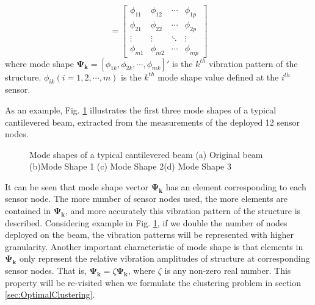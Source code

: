 \begin{equation}
[\mathbf{\Psi_1}, \mathbf{\Psi_2}, \cdots, \mathbf{\Psi_p}]=
\begin{bmatrix}
\phi_{11} & \phi_{12} & \cdots & \phi_{1p}\\
\phi_{21} & \phi_{22} & \cdots & \phi_{2p}\\
\vdots  & \vdots  & \ddots & \vdots  \\
\phi_{m1} & \phi_{m2} & \cdots & \phi_{mp}
\end{bmatrix} 
\end{equation}
where mode shape \(\mathbf{\Psi_k}=[\phi_{1k}, \phi_{2k}, \cdots, \phi_{mk}]'\) is the \(k^{th}\) vibration pattern of the structure.  \(\phi_{ik}(i=1,2,\cdots ,m)\) is the \(k^{th}\) mode shape value defined at the \(i^{th}\) sensor.

As an example, Fig. \ref{fig:modes} illustrates the first three mode shapes of a typical cantilevered beam, extracted from the measurements of the deployed 12 sensor nodes. 

\begin{figure}
\centering
\subfloat[]{\label{fig:originalbeam}
\texttt{[image: originalbeam]}}
\subfloat[]{\label{fig:mode1}
\texttt{[image: mode1]}}
\qquad
\subfloat[]{\label{fig:mode2}
\texttt{[image: mode2]}}
\subfloat[]{\label{fig:mode3}
\texttt{[image: mode3]}}
\caption{Mode shapes of a typical cantilevered beam (a) Original beam (b)Mode Shape 1 (c) Mode Shape 2(d) Mode Shape 3}
\label{fig:modes}
\end{figure}

It can be seen that mode shape vector \(\mathbf{\Psi_k}\) has an element corresponding to each sensor node. The more number of sensor nodes used, the more elements are contained in \(\mathbf{\Psi_k}\), and more accurately this vibration pattern of the structure is described. Considering example in Fig. \ref{fig:modes}, if we double the number of nodes deployed on the beam, the vibration patterns will be represented with higher granularity. Another important characteristic of mode shape is that elements in \(\mathbf{\Psi_k}\) only represent the relative vibration amplitudes of structure at corresponding sensor nodes. That is, \(\mathbf{\Psi_k}=\zeta \mathbf{\Psi_k}\), where \(\zeta\) is any non-zero real number. This property will be re-visited when we formulate the clustering problem in section \ref{sec:OptimalClustering}.

